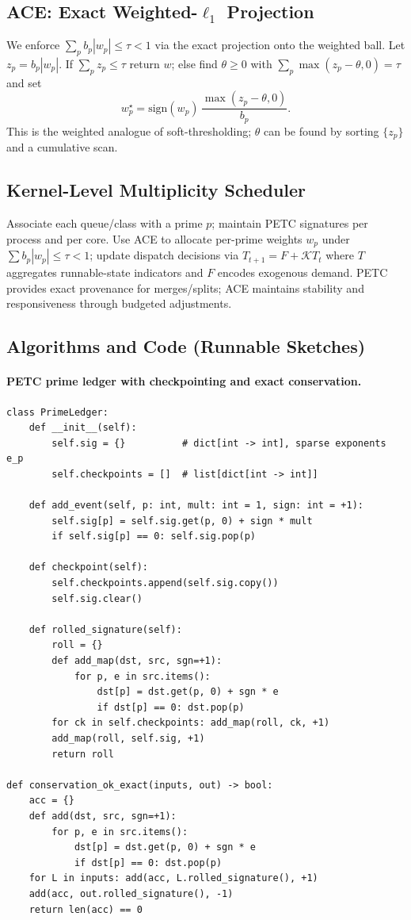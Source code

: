 \documentclass[11pt]{article}
\theoremstyle{plain}
\theoremstyle{definition}
\theoremstyle{remark}
\begin{document}
\subsection{ACE: Exact Weighted-\texorpdfstring{$\ell_1$}{l1} Projection}
We enforce $\sum_p b_p|w_p|\le\tau<1$ via the exact projection onto the weighted ball. Let $z_p=b_p|w_p|$. If $\sum_p z_p\le\tau$ return $w$; else find $\theta\ge0$ with $\sum_p \max(z_p-\theta,0)=\tau$ and set
\[
w_p^\star=\mathrm{sign}(w_p)\,\frac{\max(z_p-\theta,0)}{b_p}.
\]
This is the weighted analogue of soft-thresholding; $\theta$ can be found by sorting $\{z_p\}$ and a cumulative scan.

\subsection{Kernel-Level Multiplicity Scheduler}
\label{sec:kernel_multiplicity}
Associate each queue/class with a prime $p$; maintain PETC signatures per process and per core. Use ACE to allocate per-prime weights $w_p$ under $\sum b_p|w_p|\le\tau<1$; update dispatch decisions via $T_{t+1}=F+\mathcal{K}T_t$ where $T$ aggregates runnable-state indicators and $F$ encodes exogenous demand. PETC provides exact provenance for merges/splits; ACE maintains stability and responsiveness through budgeted adjustments.

\subsection{Algorithms and Code (Runnable Sketches)}

\paragraph{PETC prime ledger with checkpointing and exact conservation.}
\begin{verbatim}
class PrimeLedger:
    def __init__(self):
        self.sig = {}          # dict[int -> int], sparse exponents e_p
        self.checkpoints = []  # list[dict[int -> int]]

    def add_event(self, p: int, mult: int = 1, sign: int = +1):
        self.sig[p] = self.sig.get(p, 0) + sign * mult
        if self.sig[p] == 0: self.sig.pop(p)

    def checkpoint(self):
        self.checkpoints.append(self.sig.copy())
        self.sig.clear()

    def rolled_signature(self):
        roll = {}
        def add_map(dst, src, sgn=+1):
            for p, e in src.items():
                dst[p] = dst.get(p, 0) + sgn * e
                if dst[p] == 0: dst.pop(p)
        for ck in self.checkpoints: add_map(roll, ck, +1)
        add_map(roll, self.sig, +1)
        return roll

def conservation_ok_exact(inputs, out) -> bool:
    acc = {}
    def add(dst, src, sgn=+1):
        for p, e in src.items():
            dst[p] = dst.get(p, 0) + sgn * e
            if dst[p] == 0: dst.pop(p)
    for L in inputs: add(acc, L.rolled_signature(), +1)
    add(acc, out.rolled_signature(), -1)
    return len(acc) == 0
\end{verbatim}
\end{document}
